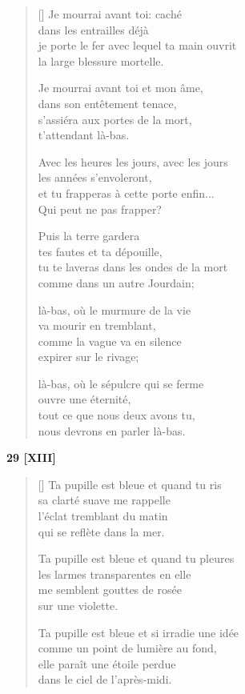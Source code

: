 \documentclass[a4paper,12pt]{book}
\begin{document}
\begin{verse}[\versewidth]
  Je mourrai avant toi: caché \\
  dans les entrailles déjà \\
  je porte le fer avec lequel ta main ouvrit \\
  la large blessure mortelle.

  Je mourrai avant toi et mon âme, \\
  dans son entêtement tenace, \\
  s'assiéra aux portes de la mort, \\
  t'attendant là-bas.

  Avec les heures les jours, avec les jours \\
  les années s'envoleront, \\
  et tu frapperas à cette porte enfin... \\
  Qui peut ne pas frapper?

  Puis la terre gardera \\
  tes fautes et ta dépouille, \\
  tu te laveras dans les ondes de la mort \\
  comme dans un autre Jourdain;

  là-bas, où le murmure de la vie \\
  va mourir en tremblant, \\
  comme la vague va en silence \\
  expirer sur le rivage;

  là-bas, où le sépulcre qui se ferme \\
  ouvre une éternité, \\
  tout ce que nous deux avons tu, \\
  nous devrons en parler là-bas.
\end{verse}

\bigskip

\begin{center}
  \textbf{29 [XIII]}
\end{center}

\settowidth{\versewidth}{comme un point de lumière irradie une idée,}

\begin{verse}[\versewidth]
  Ta pupille est bleue et quand tu ris \\
  sa clarté suave me rappelle \\
  l'éclat tremblant du matin \\
  qui se reflète dans la mer.

  Ta pupille est bleue et quand tu pleures \\
  les larmes transparentes en elle \\
  me semblent gouttes de rosée \\
  sur une violette.

  Ta pupille est bleue et si irradie une idée \\
  comme un point de lumière au fond, \\
  elle paraît une étoile perdue \\
  dans le ciel de l'après-midi.
\end{verse}
\end{document}
